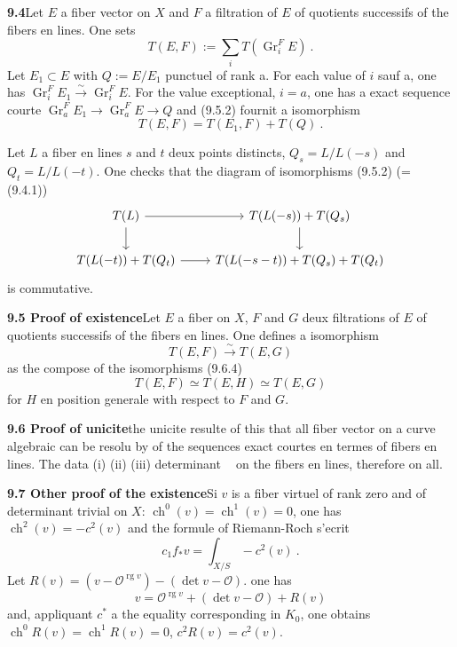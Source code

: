 \documentclass[12pt,a4paper]{article}
\theoremstyle{plain}
\theoremstyle{definition}
\theoremstyle{remark}
\DeclareMathOperator{\ch}{ch}
\DeclareMathOperator{\Gr}{Gr}
\newcommand{\calO}{\mathcal{O}}
\DeclareMathOperator{\rg}{rg}
\DeclareMathOperator{\ICtwo}{IC_2}
\newcommand{\simto}{\xrightarrow{\sim}}
\begin{document}
\medskip
\noindent\textbf{9.4}\quad Let $E$ a fiber vector on $X$ and $F$ a filtration of $E$ of quotients successifs of the fibers en lines. One sets
\[
T(E, F) := \sum_i T(\Gr_i^F E) \ .
\]
Let $E_1 \subset E$ with $Q := E/E_1$ punctuel of rank a. For each value of $i$ sauf a, one has $\Gr_i^F E_1 \simto \Gr_i^F E$. For the value exceptional, $i = a$, one has a exact sequence courte $\Gr_a^F E_1 \to \Gr_a^F E \to Q$ and (9.5.2) fournit a isomorphism
\begin{equation}
\label{eq:9.4.1}
T(E, F) = T(E_1, F) + T(Q) \ .
\end{equation}

Let $L$ a fiber en lines $s$ and $t$ deux points distincts, $Q_s = L/L(-s)$ and $Q_t = L/L(-t)$. One checks that the diagram of isomorphisms (9.5.2) (= (9.4.1))
\begin{equation}
\label{eq:9.4.2}
\begin{tikzcd}
T(L) \arrow[r] \arrow[d] & T(L(-s)) + T(Q_s) \arrow[d] \\
T(L(-t)) + T(Q_t) \arrow[r] & T(L(-s-t)) + T(Q_s) + T(Q_t)
\end{tikzcd}
\end{equation}
is commutative.

\medskip
\noindent\textbf{9.5 Proof of existence}\quad Let $E$ a fiber on $X$, $F$ and $G$ deux filtrations of $E$ of quotients successifs of the fibers en lines. One defines a isomorphism
\begin{equation}
\label{eq:9.5.1}
T(E, F) \simto T(E, G)
\end{equation}
as the compose of the isomorphisms (9.6.4)
\[
T(E, F) \simeq T(E, H) \simeq T(E, G)
\]
for $H$ en position generale with respect to $F$ and $G$.

\medskip
\noindent\textbf{9.6 Proof of unicite}\quad the unicite resulte of this that all fiber vector on a curve algebraic can be resolu by of the sequences exact courtes en termes of fibers en lines. The data (i) (ii) (iii) determinant $\ICtwo$ on the fibers en lines, therefore on all.

\medskip
\noindent\textbf{9.7 Other proof of the existence}\quad Si $v$ is a fiber virtuel of rank zero and of determinant trivial on $X$: $\ch^0(v) = \ch^1(v) = 0$, one has $\ch^2(v) = -c^2(v)$ and the formule of Riemann-Roch s'ecrit
\[
c_1 f_* v = \int_{X/S} -c^2(v) \ .
\]
Let $R(v) = (v - \calO^{\rg v}) - (\det v - \calO)$. one has
\begin{equation}
\label{eq:9.7.1}
v = \calO^{\rg v} + (\det v - \calO) + R(v)
\end{equation}
and, appliquant $c^*$ a the equality corresponding in $K_0$, one obtains $\ch^0 R(v) = \ch^1 R(v) = 0$, $c^2 R(v) = c^2(v)$.
\end{document}
